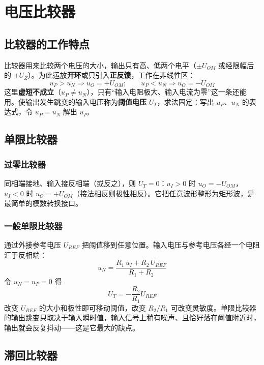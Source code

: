 \section{电压比较器}
\subsection{比较器的工作特点}
比较器用来比较两个电压的大小，输出只有高、低两个电平（$\pm U_{OM}$ 或经限幅后的 $\pm U_Z$）。为此运放\textbf{开环}或只引入\textbf{正反馈}，工作在非线性区：
\begin{equation}
u_P>u_N \Rightarrow u_O=+U_{OM};\qquad
u_P<u_N \Rightarrow u_O=-U_{OM}
\end{equation}
这里\textbf{虚短不成立}（$u_P\neq u_N$），只有“输入电阻极大、输入电流为零”这一条还能用。使输出发生跳变的输入电压称为\textbf{阈值电压} $U_T$，求法固定：写出 $u_P$、$u_N$ 的表达式，令 $u_P=u_N$ 解出 $u_I$。

\subsection{单限比较器}
\subsubsection{过零比较器}
同相端接地、输入接反相端（或反之），则 $U_T=0$：$u_I>0$ 时 $u_O=-U_{OM}$，$u_I<0$ 时 $u_O=+U_{OM}$（接法相反则极性相反）。它把任意波形整形为矩形波，是最简单的模数转换接口。

\subsubsection{一般单限比较器}
通过外接参考电压 $U_{REF}$ 把阈值移到任意位置。输入电压与参考电压各经一个电阻汇于反相端：
\begin{equation}
u_N=\frac{R_1\,u_I+R_2\,U_{REF}}{R_1+R_2}
\end{equation}
令 $u_N=u_P=0$ 得
\begin{equation}
U_T=-\frac{R_2}{R_1}U_{REF}
\end{equation}
改变 $U_{REF}$ 的大小和极性即可移动阈值，改变 $R_2/R_1$ 可改变灵敏度。单限比较器的输出跳变只取决于输入瞬时值，输入信号上稍有噪声、且恰好落在阈值附近时，输出就会反复抖动——这是它最大的缺点。

\subsection{滞回比较器}
